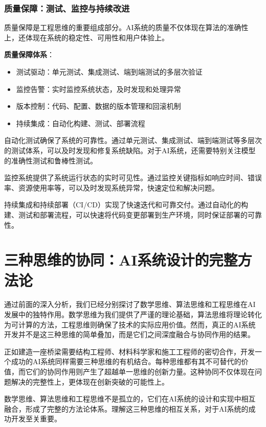 \subsubsection{质量保障：测试、监控与持续改进}

质量保障是工程思维的重要组成部分。AI系统的质量不仅体现在算法的准确性上，还体现在系统的稳定性、可用性和用户体验上。

\textbf{质量保障体系}：
 \begin{itemize}
 \item 测试驱动：单元测试、集成测试、端到端测试的多层次验证
 \item 监控告警：实时监控系统状态，及时发现和处理异常
 \item 版本控制：代码、配置、数据的版本管理和回滚机制
 \item 持续集成：自动化构建、测试、部署流程
 \end{itemize}

自动化测试确保了系统的可靠性。通过单元测试、集成测试、端到端测试等多层次的测试体系，可以及时发现和修复系统缺陷。对于AI系统，还需要特别关注模型的准确性测试和鲁棒性测试。

监控系统提供了系统运行状态的实时可见性。通过监控关键指标如响应时间、错误率、资源使用率等，可以及时发现系统异常，快速定位和解决问题。

持续集成和持续部署（CI/CD）实现了快速迭代和可靠交付。通过自动化的构建、测试和部署流程，可以快速将代码变更部署到生产环境，同时保证部署的可靠性。

\section{三种思维的协同：AI系统设计的完整方法论}

通过前面的深入分析，我们已经分别探讨了数学思维、算法思维和工程思维在AI发展中的独特作用。数学思维为我们提供了严谨的理论基础，算法思维将理论转化为可计算的方法，工程思维则确保了技术的实际应用价值。然而，真正的AI系统开发并不是这三种思维的简单叠加，而是它们之间深度融合与协同作用的结果。

正如建造一座桥梁需要结构工程师、材料科学家和施工工程师的密切合作，开发一个成功的AI系统同样需要三种思维的有机结合。每种思维都有其不可替代的价值，而它们的协同作用则产生了超越单一思维的创新力量。这种协同不仅体现在问题解决的完整性上，更体现在创新突破的可能性上。

数学思维、算法思维和工程思维不是孤立的，它们在AI系统的设计和实现中相互融合，形成了完整的方法论体系。理解这三种思维的相互关系，对于AI系统的成功开发至关重要。

